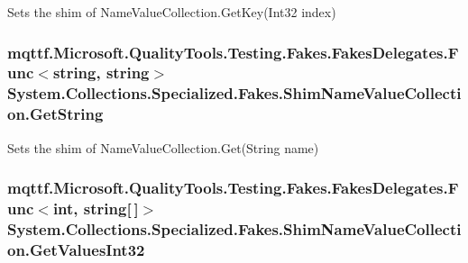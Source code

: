 Sets the shim of Name\-Value\-Collection.\-Get\-Key(\-Int32 index)

\hypertarget{class_system_1_1_collections_1_1_specialized_1_1_fakes_1_1_shim_name_value_collection_ae2075f400a4b3ba2b9dd44c255678832}{
\subsubsection[{Get\-String}]{\setlength{\rightskip}{0pt plus 5cm}mqttf.\-Microsoft.\-Quality\-Tools.\-Testing.\-Fakes.\-Fakes\-Delegates.\-Func$<$string, string$>$ System.\-Collections.\-Specialized.\-Fakes.\-Shim\-Name\-Value\-Collection.\-Get\-String\hspace{0.3cm}{\ttfamily [set]}}}\label{class_system_1_1_collections_1_1_specialized_1_1_fakes_1_1_shim_name_value_collection_ae2075f400a4b3ba2b9dd44c255678832}


Sets the shim of Name\-Value\-Collection.\-Get(\-String name)

\hypertarget{class_system_1_1_collections_1_1_specialized_1_1_fakes_1_1_shim_name_value_collection_a25f6efc1a9316b6819812c50b7a98a01}{
\subsubsection[{Get\-Values\-Int32}]{\setlength{\rightskip}{0pt plus 5cm}mqttf.\-Microsoft.\-Quality\-Tools.\-Testing.\-Fakes.\-Fakes\-Delegates.\-Func$<$int, string\mbox{[}$\,$\mbox{]}$>$ System.\-Collections.\-Specialized.\-Fakes.\-Shim\-Name\-Value\-Collection.\-Get\-Values\-Int32\hspace{0.3cm}{\ttfamily [set]}}}\label{class_system_1_1_collections_1_1_specialized_1_1_fakes_1_1_shim_name_value_collection_a25f6efc1a9316b6819812c50b7a98a01}


